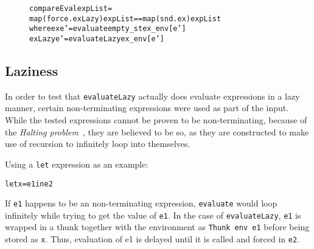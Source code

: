 \begin{figure}[!ht]
\begin{alltt}
  compareEval expList =
    map (force . exLazy) expList == map (snd . ex) expList
      where ex     e' = evaluate empty_st ex_env [e']
            exLazy e' = evaluateLazy ex_env [e']
\end{alltt}
\end{figure}

\subsection{Laziness}
\label{lazinessSem}
In order to test that \texttt{evaluateLazy} actually does evaluate expressions
in a lazy manner, certain non-terminating expressions were used as part of the
input. While the tested expressions cannot be proven to be non-terminating,
because of the \textit{Halting problem}~\cite{haltingproblem}, they are believed
to be so, as they are constructed to make use of recursion to infinitely loop
into themselves.

Using a \texttt{let} expression as an example:
\begin{alltt}
  let x = e1 in e2
\end{alltt}
If \texttt{e1} happens to be an non-terminating expression, \texttt{evaluate}
would loop infinitely while trying to get the value of \texttt{e1}.
In the case of \texttt{evaluateLazy}, \texttt{e1} is wrapped in a thunk
together with the environment as \texttt{Thunk env e1} before being stored
as \texttt{x}. Thus, evaluation of e1 is delayed until it is called and forced
in \texttt{e2}.
